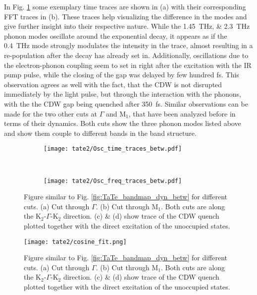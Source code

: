 In Fig. \ref{fig:TaTe_FFT_traces_betw} some exemplary time traces are shown in (a) with their corresponding FFT traces in (b).
These traces help visualizing the difference in the modes and give further insight into their respective nature.
While the \qtylist{1.45; 2.3}{\tera\hertz} phonon modes oscillate around the exponential decay, it appears as if the \qty{0.4}{\tera\hertz} mode strongly modulates the intensity in the trace, almost resulting in a re-population after the decay has already set in.
Additionally, oscillations due to the electron-phonon coupling seem to set in right after the excitation with the IR pump pulse, while the closing of the gap was delayed by few hundred \unit{\femto\second}.
This observation agrees as well with the fact, that the CDW is not disrupted immediately by the light pulse, but through the interaction with the phonons, with the the CDW gap being quenched after \qty{350}{\femto\second}.
Similar observations can be made for the two other cuts at $\Gamma$ and M$_1$, that have been analyzed before in terms of their dynamics.
Both cuts show the three phonon modes listed above and show them couple to different bands in the band structure.

\begin{figure}[t!]
	\centering
	\begin{subfigure}[b]{\textwidth}
		\texttt{[image: tate2/Osc\_time\_traces\_betw.pdf]}
		\caption{}
	\end{subfigure}
	\\
	\begin{subfigure}[b]{\textwidth}
		\texttt{[image: tate2/Osc\_freq\_traces\_betw.pdf]}
		\caption{}
	\end{subfigure}
	\caption{Figure similar to Fig. \ref{fig:TaTe_bandmap_dyn_betw} for different cuts. (a) Cut through $\Gamma$. (b) Cut through M$_1$. Both cuts are along the K$_2$-$\Gamma$-K$_2$ direction. (c) \& (d) show trace of the CDW quench plotted together with the direct excitation of the unoccupied states.}
	\label{fig:TaTe_FFT_traces_betw}
\end{figure}

\begin{figure}[b!]
	\centering
	\texttt{[image: tate2/cosine\_fit.png]}
	\caption{Figure similar to Fig. \ref{fig:TaTe_bandmap_dyn_betw} for different cuts. (a) Cut through $\Gamma$. (b) Cut through M$_1$. Both cuts are along the K$_2$-$\Gamma$-K$_2$ direction. (c) \& (d) show trace of the CDW quench plotted together with the direct excitation of the unoccupied states.}
	\label{fig:TaTe_cosine}
\end{figure}

